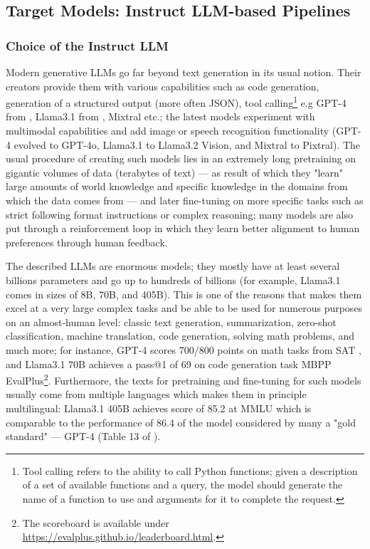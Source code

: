 \documentclass[11pt]{article}
\begin{document}
\subsection{Target Models: Instruct LLM-based Pipelines}

\subsubsection{Choice of the Instruct LLM}

Modern generative LLMs go far beyond text generation in its usual notion. Their creators provide them with various capabilities such as code generation, generation of a structured output (more often JSON), tool calling\footnote{Tool calling refers to the ability to call Python functions; given a description of a set of available functions and a query, the model should generate the name of a function to use and arguments for it to complete the request.} e.g GPT-4 from \citet{openai2024gpt4technicalreport}, Llama3.1 from \citet{dubey2024llama3herdmodels}, Mixtral \cite{jiang2024mixtralexperts} etc.; the latest models experiment with multimodal capabilities and add image or speech recognition functionality (GPT-4 evolved to GPT-4o, Llama3.1 to Llama3.2 Vision, and Mixtral to Pixtral). The usual procedure of creating such models lies in an extremely long pretraining on gigantic volumes of data (terabytes of text) --- as result of which they "learn" large amounts of world knowledge and specific knowledge in the domains from which the data comes from --- and later fine-tuning on more specific tasks such as strict following format instructions or complex reasoning; many models are also put through a reinforcement loop in which they learn better alignment to human preferences through human feedback.

The described LLMs are enormous models; they mostly have at least several billions parameters and go up to hundreds of billions (for example, Llama3.1 comes in sizes of 8B, 70B, and 405B). This is one of the reasons that makes them excel at a very large complex tasks and be able to be used for numerous purposes on an almost-human level: classic text generation, summarization, zero-shot classification, machine translation, code generation, solving math problems, and much more; for instance, GPT-4 scores 700/800 points on math tasks from SAT \cite{openai2024gpt4technicalreport}, and Llama3.1 70B achieves a pass@1 of 69 on code generation task MBPP EvalPlus\footnote{The scoreboard is available under \url{https://evalplus.github.io/leaderboard.html}.}. Furthermore, the texts for pretraining and fine-tuning for such models usually come from multiple languages which makes them in principle multilingual: Llama3.1 405B achieves score of 85.2 at MMLU \cite{hendrycks2021measuringmassivemultitasklanguage} which is comparable to the performance of 86.4 of the model considered by many a "gold standard" --- GPT-4 (Table 13 of \citealt{dubey2024llama3herdmodels}).
\end{document}
